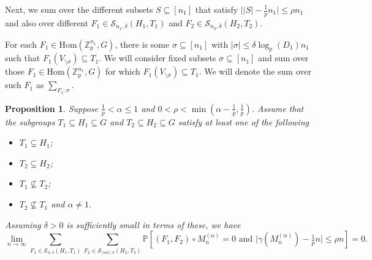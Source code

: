\documentclass[12pt]{amsart}
\newtheorem{proposition}[theorem]{Proposition}
\theoremstyle{definition}
\newcommand{\PPP}{\mathbb{P}}
\newcommand{\SSS}[3]{\mathcal{S}_{#1}(#2,#3)}
\newcommand{\Mna}{M_{n}^{(\alpha)}}
\newcommand{\abs}[1]{\vert#1\vert}
\newcommand{\Zp}{\Z_p}
\newcommand{\Z}{\mathbb{Z}}
\newcommand{\Hom}{\text{Hom}}
\newcommand{\ceil}[1]{\lceil#1\rceil}
\begin{document}
Next, we sum over the different subsets $S\subseteq[n_1]$ that satisfy $\abs{\abs{S}-\frac{1}{p}n_1}\leq \rho n_1$ and also over different $F_1\in \SSS{n_1,\delta}{H_1}{T_1}$ and $F_2\in \SSS{n_2,\delta}{H_2}{T_2}$.

For each $F_1\in \Hom(\Zp^{n_1},G)$, there is some $\sigma\subseteq[n_1]$ with $\abs{\sigma}\leq \delta\log_p(D_1) n_1$ such that $F_1(V_{\setminus \sigma})\subseteq T_1$. We will consider fixed subsets $\sigma\subseteq [n_1]$ and sum over those $F_1\in \Hom(\Zp^{n_1},G)$ for which $F_1(V_{\setminus \sigma})\subseteq T_1$. We will denote the sum over such $F_1$ as $\sum_{F_1:\sigma}$.

\begin{proposition}\label{Prop: ind diag error term}
Suppose $\frac{1}{p}<\alpha\leq 1$ and $0<\rho< \min(\alpha-\frac{1}{p},\frac{1}{p})$.
Assume that the subgroups $T_1\subseteq H_1\subseteq G$ and $T_2\subseteq H_2\subseteq G$ satisfy at least one of the following
\begin{itemize}
    \item $T_1\subsetneq H_1$;
    \item $T_2\subsetneq H_2$;
    \item $T_1\not\subseteq T_2$;
    \item $T_2\not\subseteq T_1$ and $\alpha\neq 1$.
\end{itemize}
Assuming $\delta>0$ is sufficiently small in terms of these, we have
\[
\lim_{n\to\infty}
\sum_{F_1\in \SSS{n,\delta}{H_1}{T_1}}
\sum_{F_2\in \SSS{\ceil{\alpha n},\delta}{H_2}{T_2}}
\PPP[(F_1,F_2)\circ \Mna=0 \text{ and } \abs{\gamma(\Mna)-\tfrac{1}{p}n} \leq \rho n]
=0.
\]
\end{proposition}
\end{document}
